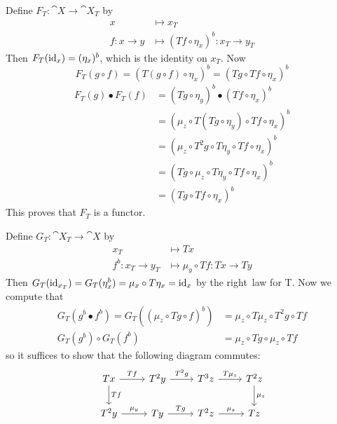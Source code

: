 \begin{beweis}
    \begin{itemize1}
    \item Define $F_T \colon \cat{X} \to \cat{X_T}$ by 
    \begin{align*}
        x &\mapsto x_T \\
        f \colon x \to y &\mapsto (Tf \circ \eta_x)^b \colon x_T \to y_T
    \end{align*}
    Then $F_T(\operatorname{id}_x) = (\eta_x)^b$, which is the identity on $x_T$. Now
    \[
        F_T(g \circ f) = (T(g \circ f) \circ \eta_x)^b = (Tg \circ Tf \circ \eta_x)^b
    \]
    \begin{align*}
        F_T(g) \bullet F_T(f) &= (Tg \circ \eta_y)^b \bullet (Tf \circ \eta_x)^b 
        \tag{Definition of $F^T$}\\
        &= (\mu_z \circ T(Tg \circ \eta_y) \circ Tf \circ \eta_x)^b 
        \tag{Definition of Kleisli composition}\\
        &= (\mu_z \circ T^2g \circ T\eta_y \circ Tf \circ \eta_x)^b 
        \tag{Functoriality of T}\\
        &= (Tg \circ \mu_z \circ T\eta_y \circ Tf \circ \eta_x)^b 
        \tag{Naturality of $\mu$}\\
        &= (Tg \circ Tf \circ \eta_x)^b \tag{right~\refunitality law for $T$}
    \end{align*}
    This proves that $F_T$ is a functor.
    \item Define $G_T \colon \cat{X_T} \to \cat{X}$ by
    \begin{align*}
        x_T &\mapsto Tx \\
        f^b \colon x_T \to y_T &\mapsto \mu_y \circ Tf \colon Tx \to Ty
    \end{align*}
    Then $G_T(\operatorname{id}_{x_T}) = G_T(\eta_x^b) = \mu_x \circ T\eta_x = \operatorname{id}_x$ by the right~ law for T.
    Now we compute that
    \begin{align*}
        G_T(g^b \bullet f^b) = G_T((\mu_z \circ Tg \circ f)^b) &=
        \mu_z \circ T \mu_z \circ T^2g \circ Tf \\
        G_T(g^b) \circ G_T(f^b) &= \mu_z \circ Tg \circ \mu_z \circ Tf 
    \end{align*}
    so it suffices to show that the following diagram commutes:
    \[
    \begin{tikzcd}
        Tx \ar[r,"Tf"] \ar[d,"Tf"] & T^2y \ar[r,"T^2g"] & T^3z \ar[r,"T\mu_z"] & T^2z \ar[d,"\mu_z"] \\
        T^2y \ar[r,"\mu_y"] & Ty \ar[r,"Tg"] & T^2z \ar[r,"\mu_z"] & Tz

\end{tikzcd}\]
\end{itemize1}
\end{beweis}
